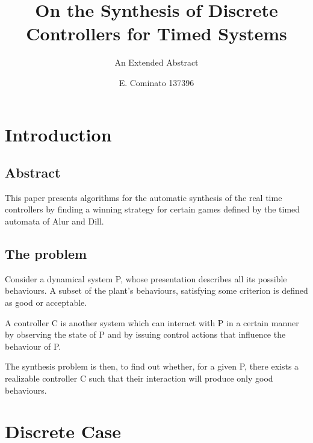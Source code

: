\documentclass[table]{beamer}
\title[Automatic Verification] %
{On the Synthesis of Discrete Controllers for Timed Systems \cite{first_article}}
\subtitle{An Extended Abstract}
\author[Enrico] %
{E. Cominato 137396\inst{1}}
\institute %
{
	\inst{1}%
	Dipartimento di Scienze Matematiche, Informatiche e Fisiche\\
	Università degli studi di Udine
}
\date[VLC 2013] %
{}
\begin{document}
\frame{\titlepage}

\section{Introduction}
\subsection{Abstract}
\begin{frame}
This paper presents algorithms for the automatic synthesis of the real time controllers by finding a winning strategy for certain games defined by the timed automata of Alur and Dill.
\end{frame}

\subsection{The problem}
\begin{frame}
Consider a dynamical system P, whose presentation descri\-bes all its possible behaviours.
A subset of the plant's be\-hav\-iours, satisfying some criterion is defined as good or acceptable.

\medskip

A controller C is another system which can interact with P in a certain manner by observing the state of P and by issuing control actions that influence the behaviour of P.
\end{frame}

\begin{frame}
The synthesis problem is then, to find out whether, for a given P, there exists a realizable controller C
such that their interaction will produce only good behaviours.
\end{frame}

\section{Discrete Case}
\end{document}

